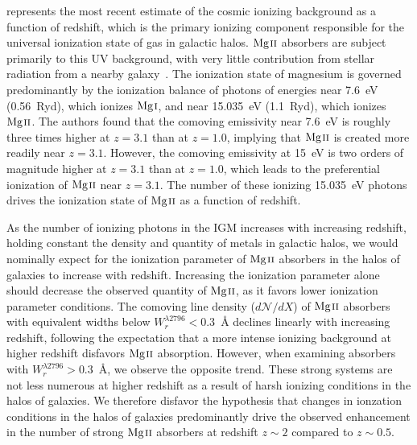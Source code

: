 \documentclass[iop,apj,numberedappendix,appendixfloats,twocolappendix]{emulateapj}
\begin{document}
\cite{Haardt2012} represents the most recent estimate of the cosmic ionizing background as a function of redshift, which is the primary ionizing component responsible for the universal ionization state of gas in galactic halos. ${\hbox{{\rm Mg}\kern 0.1em{\sc ii}}}$ absorbers are subject primarily to this UV background, with very little contribution from stellar radiation from a nearby galaxy~\citep{Churchill1999,Charlton2000,Rigby2002}. The ionization state of magnesium is governed predominantly by the ionization balance of photons of energies near 7.6~eV (0.56~Ryd), which ionizes ${\hbox{{\rm Mg}\kern 0.1em{\sc i}}}$, and near 15.035~eV (1.1~Ryd), which ionizes ${\hbox{{\rm Mg}\kern 0.1em{\sc ii}}}$. The authors found that the comoving emissivity near 7.6~eV is roughly three times higher at $z = 3.1$ than at $z = 1.0$, implying that ${\hbox{{\rm Mg}\kern 0.1em{\sc ii}}}$ is created more readily near $z = 3.1$. However, the comoving emissivity at 15~eV is two orders of magnitude higher at $z = 3.1$ than at $z = 1.0$, which leads to the preferential ionization of ${\hbox{{\rm Mg}\kern 0.1em{\sc ii}}}$ near $z = 3.1$. The number of these ionizing 15.035~eV photons drives the ionization state of ${\hbox{{\rm Mg}\kern 0.1em{\sc ii}}}$ as a function of redshift.

As the number of ionizing photons in the IGM increases with increasing redshift, holding constant the density and quantity of metals in galactic halos, we would nominally expect for the ionization parameter of ${\hbox{{\rm Mg}\kern 0.1em{\sc ii}}}$ absorbers in the halos of galaxies to increase with redshift. Increasing the ionization parameter alone should decrease the observed quantity of ${\hbox{{\rm Mg}\kern 0.1em{\sc ii}}}$, as it favors lower ionization parameter conditions. The comoving line density ($d\mathcal{N}\!/dX$) of ${\hbox{{\rm Mg}\kern 0.1em{\sc ii}}}$ absorbers with equivalent widths below $W_r^{\lambda2796} < 0.3$~{\AA} declines linearly with increasing redshift, following the expectation that a more intense ionizing background at higher redshift disfavors ${\hbox{{\rm Mg}\kern 0.1em{\sc ii}}}$ absorption. However, when examining absorbers with $W_r^{\lambda2796} > 0.3$~{\AA}, we observe the opposite trend. These strong systems are not less numerous at higher redshift as a result of harsh ionizing conditions in the halos of galaxies. We therefore disfavor the hypothesis that changes in ionzation conditions in the halos of galaxies predominantly drive the observed enhancement in the number of strong ${\hbox{{\rm Mg}\kern 0.1em{\sc ii}}}$ absorbers at redshift $z \sim 2$ compared to $z \sim 0.5$.

\end{document}
